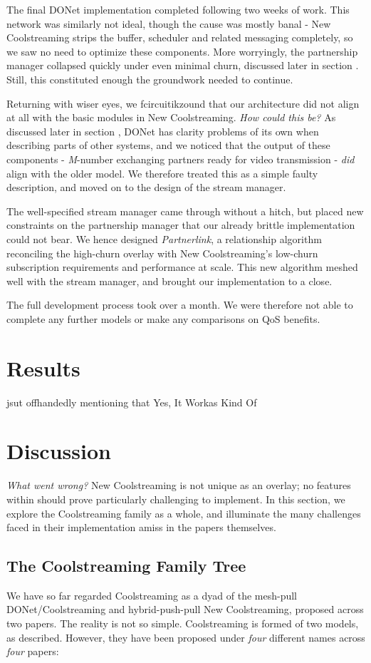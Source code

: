 \documentclass[12pt,a4paper]{article}
\begin{document}
The final DONet implementation completed following two weeks of work. This network was similarly not ideal, though the cause was mostly banal - New Coolstreaming strips the buffer, scheduler and related messaging completely, so we saw no need to optimize these components. More worryingly, the partnership manager collapsed quickly under even minimal churn, discussed later in section . Still, this constituted enough the groundwork needed to continue.

Returning with wiser eyes, we fcircuitikzound that our architecture did not align at all with the basic modules in New Coolstreaming. \textit{How could this be?} As discussed later in section , DONet has clarity problems of its own when describing parts of other systems, and we noticed that the output of these components - \textit{M}-number exchanging partners ready for video transmission - \textit{did} align with the older model. We therefore treated this as a simple faulty description, and moved on to the design of the stream manager.

The well-specified stream manager came through without a hitch, but placed new constraints on the partnership manager that our already brittle implementation could not bear. We hence designed \textit{Partnerlink}, a relationship algorithm reconciling the high-churn overlay with New Coolstreaming's low-churn subscription requirements and performance at scale. This new algorithm meshed well with the stream manager, and brought our implementation to a close.

The full development process took over a month. We were therefore not able to complete any further models or make any comparisons on QoS benefits.

\section{Results}
jsut offhandedly mentioning that Yes, It Workas Kind Of
\section{Discussion}
\textit{What went wrong?} New Coolstreaming is not unique as an overlay; no features within should prove particularly challenging to implement. In this section, we explore the Coolstreaming family as a whole, and illuminate the many challenges faced in their implementation amiss in the papers themselves.
\subsection{The Coolstreaming Family Tree}
We have so far regarded Coolstreaming as a dyad of the mesh-pull DONet/Coolstreaming and hybrid-push-pull New Coolstreaming, proposed across two papers. The reality is not so simple. Coolstreaming is formed of two models, as described. However, they have been proposed under \textit{four} different names across \textit{four} papers:
\end{document}
